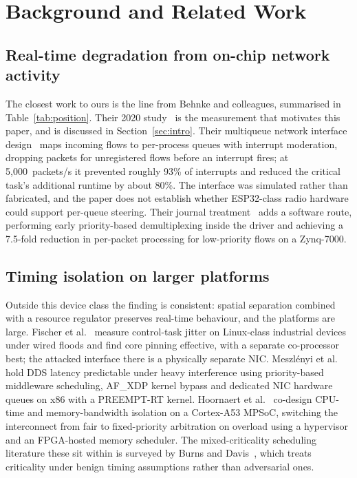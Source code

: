 \section{Background and Related Work}\label{sec:related}

\subsection{Real-time degradation from on-chip network activity}

The closest work to ours is the line from Behnke and colleagues, summarised in
Table~\ref{tab:position}. Their 2020 study~\cite{behnke2020} is the measurement that motivates
this paper, and is discussed in Section~\ref{sec:intro}. Their multiqueue network interface
design~\cite{behnke2022} maps incoming flows to per-process queues with interrupt moderation,
dropping packets for unregistered flows before an interrupt fires; at 5{,}000~packets/s it
prevented roughly 93\% of interrupts and reduced the critical task's additional runtime by about
80\%. The interface was simulated rather than fabricated, and the paper does not establish whether
ESP32-class radio hardware could support per-queue steering. Their journal
treatment~\cite{behnke2023} adds a software route, performing early priority-based demultiplexing
inside the driver and achieving a 7.5-fold reduction in per-packet processing for low-priority
flows on a Zynq-7000.

\subsection{Timing isolation on larger platforms}

Outside this device class the finding is consistent: spatial separation combined with a resource
regulator preserves real-time behaviour, and the platforms are large. Fischer
et al.~\cite{fischer2020} measure control-task jitter on Linux-class industrial devices under
wired floods and find core pinning effective, with a separate co-processor best; the attacked
interface there is a physically separate NIC. Meszl\'enyi et al.~\cite{timingiso2025} hold DDS
latency predictable under heavy interference using priority-based middleware scheduling, AF\_XDP
kernel bypass and dedicated NIC hardware queues on x86 with a PREEMPT-RT kernel. Hoornaert
et al.~\cite{mcti2024} co-design CPU-time and memory-bandwidth isolation on a Cortex-A53 MPSoC,
switching the interconnect from fair to fixed-priority arbitration on overload using a hypervisor
and an FPGA-hosted memory scheduler. The mixed-criticality scheduling literature these sit within
is surveyed by Burns and Davis~\cite{mcreview2026}, which treats criticality under benign timing
assumptions rather than adversarial ones.


